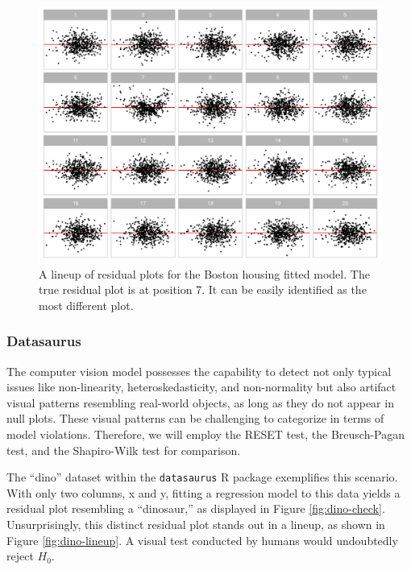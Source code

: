 \documentclass[]{interact}
\theoremstyle{plain}%
\theoremstyle{definition}
\theoremstyle{remark}
\begin{document}
\begin{figure}[!h]

{\centering \includegraphics[width=1\linewidth]{paper_files/figure-latex/boston-lineup-1} 

}

\caption{A lineup of residual plots for the Boston housing fitted model. The true residual plot is at position 7. It can be easily identified as the most different plot.}\label{fig:boston-lineup}
\end{figure}

\subsubsection{Datasaurus}\label{datasaurus}

The computer vision model possesses the capability to detect not only
typical issues like non-linearity, heteroskedasticity, and non-normality
but also artifact visual patterns resembling real-world objects, as long
as they do not appear in null plots. These visual patterns can be
challenging to categorize in terms of model violations. Therefore, we
will employ the RESET test, the Breusch-Pagan test, and the Shapiro-Wilk
test \citep{shapiro1965analysis} for comparison.

The ``dino'' dataset within the \texttt{datasaurus} R package
exemplifies this scenario. With only two columns, x and y, fitting a
regression model to this data yields a residual plot resembling a
``dinosaur,'' as displayed in Figure \ref{fig:dino-check}.
Unsurprisingly, this distinct residual plot stands out in a lineup, as
shown in Figure \ref{fig:dino-lineup}. A visual test conducted by humans
would undoubtedly reject \(H_0\).
\end{document}
